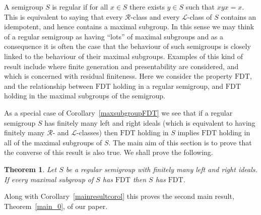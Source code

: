 \documentclass[11pt]{amsart}
\newtheorem{thm}{Theorem}
\theoremstyle{plain}
\begin{document}
A semigroup  $S$ is regular if for all $x \in S$ there exists $y \in S$ such that $xyx=x$. This is equivalent to saying that every ${\mathcal{R}}$-class and every ${\mathcal{L}}$-class of $S$ contains an idempotent, and hence contains a maximal subgroup. In this sense we may think of a regular semigroup  as having ``lots'' of maximal subgroups and as a consequence it is often the case that the behaviour of such semigroups is closely linked to the behaviour of their maximal subgroups. Examples of this kind of result include \cite{Ruskuc2} where finite generation and presentability are considered, and \cite{Golubov1} which is concerned with residual finiteness. Here we consider the property $\mathrm{FDT}$, and the relationship between $\mathrm{FDT}$ holding in a regular semigroup, and $\mathrm{FDT}$ holding in the maximal subgroups of the semigroup.

As a special case of Corollary~\ref{maxsubgroupFDT} we see that if a regular semigroup $S$ has finitely many left and right ideals (which is equivalent to having finitely many ${\mathcal{R}}$- and ${\mathcal{L}}$-classes) then $\mathrm{FDT}$ holding in $S$ implies $\mathrm{FDT}$ holding in all of the maximal subgroups of $S$. The main aim of this section is to prove that the converse of this result is also true. We shall prove the following.

\begin{thm}\label{smalltobig}
Let $S$ be a regular semigroup with finitely many left and right ideals. If every maximal subgroup of $S$ has $\mathrm{FDT}$ then $S$ has $\mathrm{FDT}$.
\end{thm}

Along with Corollary~\ref{mainresultcorol} this proves the second main result, Theorem~\ref{main_0}, of our paper.
\end{document}
